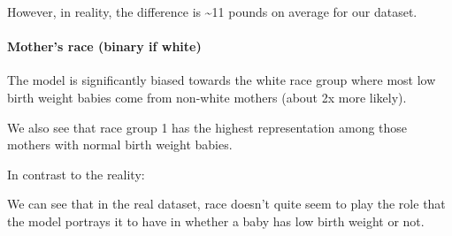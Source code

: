 \documentclass[]{article}
\newenvironment{Shaded}{\begin{snugshade}}{\end{snugshade}}
\newcommand{\CommentTok}[1]{\textcolor[rgb]{0.56,0.35,0.01}{\textit{#1}}}
\newcommand{\KeywordTok}[1]{\textcolor[rgb]{0.13,0.29,0.53}{\textbf{#1}}}
\newcommand{\NormalTok}[1]{#1}
\newcommand{\OperatorTok}[1]{\textcolor[rgb]{0.81,0.36,0.00}{\textbf{#1}}}
\let\oldparagraph\paragraph
\renewcommand{\paragraph}[1]{\oldparagraph{#1}\mbox{}}
\begin{document}
However, in reality, the difference is \textasciitilde{}11 pounds on
average for our dataset.

\hypertarget{mothers-race-binary-if-white}{%
\paragraph{Mother's race (binary if
white)}\label{mothers-race-binary-if-white}}

\begin{Shaded}
\end{Shaded}

The model is significantly biased towards the white race group where
most low birth weight babies come from non-white mothers (about 2x more
likely).

\begin{Shaded}
\end{Shaded}

We also see that race group 1 has the highest representation among those
mothers with normal birth weight babies.

In contrast to the reality:

\begin{Shaded}
\end{Shaded}

We can see that in the real dataset, race doesn't quite seem to play the
role that the model portrays it to have in whether a baby has low birth
weight or not.

\begin{Shaded}
\end{Shaded}
\end{document}
